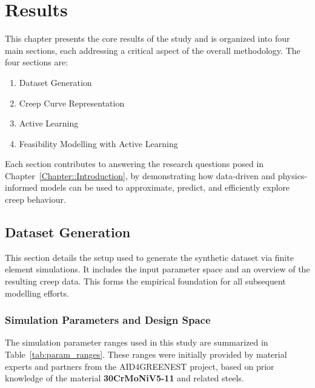 \documentclass[class=scrbook, crop=false]{standalone}
\begin{document}
	
	
	\chapter{Results}
	\label{Chapter::Results}
	
	This chapter presents the core results of the study and is organized into four main sections, each addressing a critical aspect of the overall methodology. The four sections are:
	\begin{enumerate}
		\item Dataset Generation
		\item Creep Curve Representation
		\item Active Learning
		\item Feasibility Modelling with Active Learning		 
	\end{enumerate}
	
	Each section contributes to answering the research questions posed in Chapter~\ref{Chapter::Introduction}, by demonstrating how data-driven and physics-informed models can be used to approximate, predict, and efficiently explore creep behaviour.
		
	\section{Dataset Generation}
	\label{Section::Results_Dataset_Generation}
	
	This section details the setup used to generate the synthetic dataset via finite element simulations. It includes the input parameter space and an overview of the resulting creep data. This forms the empirical foundation for all subsequent modelling efforts.
	
	\subsection{Simulation Parameters and Design Space}
	\label{Subsection::Results_Simulation_Parameters}	
	
	The simulation parameter ranges used in this study are summarized in Table~\ref{tab:param_ranges}. These ranges were initially provided by material experts and partners from the AID4GREENEST project, based on prior knowledge of the material \textbf{30CrMoNiV5-11} and related steels. 
	
\end{document}

